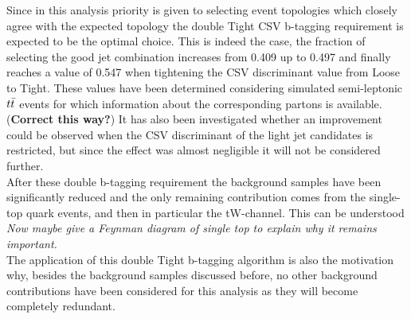Since in this analysis priority is given to selecting event topologies which closely agree with the expected topology the double Tight CSV b-tagging requirement is expected to be the optimal choice.
This is indeed the case, the fraction of selecting the good jet combination increases from 0.409 up to 0.497 and finally reaches a value of 0.547 when tightening the CSV discriminant value from Loose to Tight. These values have been determined considering simulated semi-leptonic $t\bar{t}$ events for which information about the corresponding partons is available. (\textbf{Correct this way?})
It has also been investigated whether an improvement could be observed when the CSV discriminant of the light jet candidates is restricted, but since the effect was almost negligible it will not be considered further.
\\

After these double b-tagging requirement the background samples have been significantly reduced and the only remaining contribution comes from the single-top quark events, and then in particular the tW-channel.
This can be understood 
\\
\textit{Now maybe give a Feynman diagram of single top to explain why it remains important.}\\
The application of this double Tight b-tagging algorithm is also the motivation why, besides the background samples discussed before, no other background contributions have been considered for this analysis as they will become completely redundant.
\\

